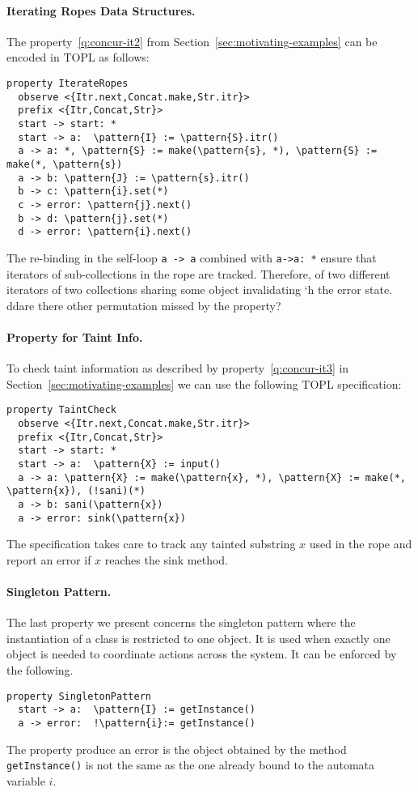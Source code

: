 \documentclass[9pt, preprint]{sigplanconf} %
\newcommand{\noterg}[2]{\textcolor{gray}{[\textcolor{red}{#1}: #2]}}
\newcommand{\dd}[1]{\noterg{dd}{#1}}
\newcommand{\delimitVerbatim}{\par\nobreak\medskip\noindent}
\newcommand{\pattern}[1]{\ensuremath{\mathtt{\underline{#1}}}}
\theoremstyle{definition}
\theoremstyle{remark}
\renewcommand{\noterg}[2]{}
\begin{document}
\paragraph{Iterating Ropes Data Structures.} %
The property~\eqref{q:concur-it2} from Section~\ref{sec:motivating-examples} can be encoded in TOPL as follows:
%
{\small
\delimitVerbatim
\begin{Verbatim}[commandchars=\\\{\}]
property IterateRopes
  observe <{Itr.next,Concat.make,Str.itr}>
  prefix <{Itr,Concat,Str}>
  start -> start: *
  start -> a:  \pattern{I} := \pattern{S}.itr()
  a -> a: *, \pattern{S} := make(\pattern{s}, *), \pattern{S} := make(*, \pattern{s})
  a -> b: \pattern{J} := \pattern{s}.itr()
  b -> c: \pattern{i}.set(*)
  c -> error: \pattern{j}.next()
  b -> d: \pattern{j}.set(*)
  d -> error: \pattern{i}.next()
\end{Verbatim}
\delimitVerbatim}%
The re-binding in the self-loop {\tt a -> a} combined with {\tt a->a: *} ensure that iterators of sub-collections in the rope are tracked. Therefore,
of two different iterators of two collections sharing some object invalidating `h the error state. 
\\dd{are there other permutation missed by the property?}

\paragraph{Property for Taint Info.} %
To check taint information as described by property~\eqref{q:concur-it3} in Section~\ref{sec:motivating-examples} we can use the following
TOPL specification:
{\small
\delimitVerbatim
\begin{Verbatim}[commandchars=\\\{\}]
property TaintCheck
  observe <{Itr.next,Concat.make,Str.itr}>
  prefix <{Itr,Concat,Str}>
  start -> start: *
  start -> a:  \pattern{X} := input()
  a -> a: \pattern{X} := make(\pattern{x}, *), \pattern{X} := make(*, \pattern{x}), (!sani)(*)
  a -> b: sani(\pattern{x})
  a -> error: sink(\pattern{x})
\end{Verbatim}
\delimitVerbatim}%
The specification takes care to track  any tainted substring $x$ used in the rope and report an error if $x$ reaches the sink method.

\paragraph{Singleton Pattern.} 
The last property we present concerns 
the singleton pattern where the instantiation of a class is restricted to one object. It is used when exactly one object is needed to coordinate actions across the system. It can be enforced by the following.
{\small
\delimitVerbatim
\begin{Verbatim}[commandchars=\\\{\}]
property SingletonPattern
  start -> a:  \pattern{I} := getInstance()
  a -> error:  !\pattern{i}:= getInstance()
\end{Verbatim}
\delimitVerbatim}%
The property produce an error is the object obtained by the method {\tt getInstance()} is not the same as the one already bound to the automata variable $i$.
\end{document}
